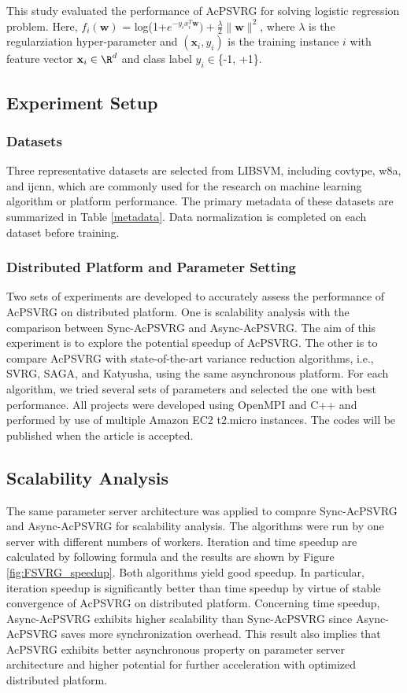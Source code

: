 This study evaluated the performance of AcPSVRG for solving logistic regression problem. Here, $f_i(\textbf{w})$ = log(1+$e^{-y_ix^T_i\textbf{w}})+\frac{\lambda}{2}\|\textbf{w}\|^2$, where $\lambda$ is the regularziation hyper-parameter and $(\textbf{x}_i, y_i)$ is the training instance $i$ with feature vector $\textbf{x}_i\in\R^d $ and class label $y_i\in$\{-1, +1\}. 

\subsection{Experiment Setup}
\subsubsection{Datasets}
Three representative datasets are selected from LIBSVM, including covtype, w8a, and ijcnn, which are commonly used for the research on machine learning algorithm or platform performance. The primary metadata of these datasets are summarized in Table \ref{metadata}. Data normalization is completed on each dataset before training.  

\subsubsection{Distributed Platform and Parameter Setting}
Two sets of experiments are developed to accurately assess the performance of AcPSVRG on distributed platform. One is scalability analysis with the comparison between Sync-AcPSVRG and Async-AcPSVRG. The aim of this experiment is to explore the potential speedup of AcPSVRG. The other is to compare AcPSVRG with state-of-the-art variance reduction algorithms, i.e., SVRG, SAGA, and Katyusha, using the same asynchronous platform. For each algorithm, we tried several sets of parameters and selected the one with best performance. All projects were developed using OpenMPI and C++ and performed by use of multiple Amazon EC2 t2.micro instances. The codes will be published when the article is accepted. 

\subsection{Scalability Analysis}
The same parameter server architecture was applied to compare Sync-AcPSVRG and Async-AcPSVRG for scalability analysis. The algorithms were run by one server with different numbers of workers. Iteration and time speedup are calculated by following formula and the results are shown by Figure \ref{fig:FSVRG_speedup}. Both algorithms yield good speedup. In particular, iteration speedup is significantly better than time speedup by virtue of stable convergence of AcPSVRG on distributed platform. Concerning time speedup, Async-AcPSVRG exhibits higher scalability than Sync-AcPSVRG since Async-AcPSVRG saves more synchronization overhead. This result also implies that AcPSVRG exhibits better asynchronous property on parameter server architecture and higher potential for further acceleration with optimized distributed platform.

